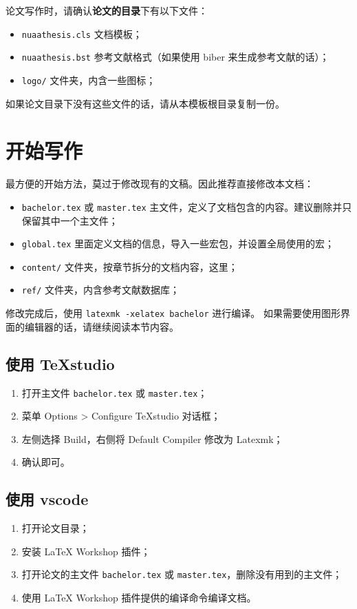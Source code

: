 论文写作时，请确认\textbf{论文的目录}下有以下文件：
\begin{itemize}
  \item \verb|nuaathesis.cls| 文档模板；
  \item \verb|nuaathesis.bst| 参考文献格式（如果使用 biber 来生成参考文献的话）；
  \item \verb|logo/| 文件夹，内含一些图标；
\end{itemize}

如果论文目录下没有这些文件的话，请从本模板根目录复制一份。

\section{开始写作}

最方便的开始方法，莫过于修改现有的文稿。因此推荐直接修改本文档：
\begin{itemize}
  \item \verb|bachelor.tex| 或 \verb|master.tex| 主文件，定义了文档包含的内容。建议删除并只保留其中一个主文件；
  \item \verb|global.tex| 里面定义文档的信息，导入一些宏包，并设置全局使用的宏；
  \item \verb|content/| 文件夹，按章节拆分的文档内容，这里；
  \item \verb|ref/| 文件夹，内含参考文献数据库；
\end{itemize}

修改完成后，使用 \verb|latexmk -xelatex bachelor| 进行编译。
如果需要使用图形界面的编辑器的话，请继续阅读本节内容。

\subsection{使用 TeXstudio}
\begin{enumerate}
\item 打开主文件 \verb|bachelor.tex| 或 \verb|master.tex|；
\item 菜单 Options > Configure TeXstudio 对话框；
\item 左侧选择 Build，右侧将 Default Compiler 修改为 Latexmk；
\item 确认即可。
\end{enumerate}

\subsection{使用 vscode}
\begin{enumerate}
\item 打开论文目录；
\item 安装 LaTeX Workshop 插件；
\item 打开论文的主文件 \verb|bachelor.tex| 或 \verb|master.tex|，删除没有用到的主文件；
\item 使用 LaTeX Workshop 插件提供的编译命令编译文档。
\end{enumerate}

